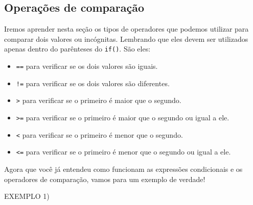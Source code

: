 \documentclass[conference]{IEEEtran}
\begin{document}
\begin{center}
\subsection{Operações de comparação}
\end{center}
\par
Iremos aprender nesta seção os tipos de operadores que podemos utilizar para comparar dois valores ou incógnitas. Lembrando que eles devem ser utilizados apenas dentro do parênteses do \texttt{if()}. São eles:

\begin{itemize}
    \item \texttt{==} para verificar se os dois valores são iguais.
    \item \texttt{!=} para verificar se os dois valores são diferentes.
    \item \texttt{>} para verificar se o primeiro é maior que o segundo.
    \item \texttt{>=} para verificar se o primeiro é maior que o segundo ou igual a ele.
    \item \texttt{<} para verificar se o primeiro é menor que o segundo.
    \item \texttt{<=} para verificar se o primeiro é menor que o segundo ou igual a ele.
\end{itemize}

\par
Agora que você já entendeu como funcionam as expressões condicionais e os operadores de comparação, vamos para um exemplo de verdade!
\\
\begin{center}
EXEMPLO 1)
\end{center}
\end{document}
